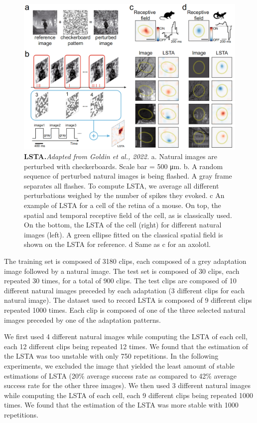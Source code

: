 \begin{figure}
    \centering
    \includegraphics[width=\textwidth]{pics/LSTAExplainV2.png}
    \caption{\textbf{LSTA.}\textit{Adapted from Goldin et al., 2022.} a.
        Natural images are
        perturbed with checkerboards. Scale bar = 500 μm. b. A random sequence
        of
        perturbed natural
        images is being flashed. A gray frame separates all flashes. To compute
        LSTA, we average all different
        perturbations weighed by the number of spikes they evoked. c An example
        of
        LSTA for a cell of the
        retina of a mouse. On top, the spatial and temporal receptive field of
        the
        cell, as is classically used. On
        the bottom, the LSTA of the cell (right) for different natural images
        (left). A green ellipse fitted on
        the classical spatial field is shown on the LSTA for reference. d Same
        as
        c for an axolotl. }
    \label{fig:LSTA}
\end{figure}

The training set is composed of 3180 clips, each composed of a grey
adaptation image followed by a natural image. The test set is composed of 30
clips, each repeated 30 times, for a total of 900 clips.
The test clips are composed of 10 different natural
images preceded by each adaptation (3 different clips for each natural image).
The dataset used to record LSTA is composed of 9 different clips repeated 1000
times. Each clip is composed of one of the three selected natural images
preceded by one of the adaptation patterns.

We first used 4 different natural images while computing the LSTA of each cell,
each 12 different clips being repeated 12 times. We found that the estimation
of the LSTA was too unstable with only 750 repetitions. In the following
experiments, we excluded the image that yielded the least amount of stable
estimations of LSTA (20\% average success rate as compared to 42\% average
success rate for the other three images). We then used 3 different natural
images while computing the LSTA of each cell, each 9 different clips being
repeated 1000 times. We found that the estimation of the LSTA was more stable
with 1000 repetitions.


